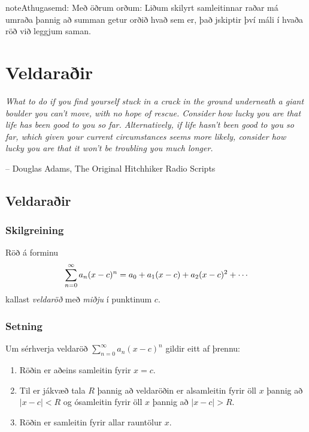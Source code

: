\documentclass[b5paper,10pt,icelandic]{sphinxmanual}
\begin{document}
\begin{notice}{note}{Athugasemd:}
Með öðrum orðum:
Liðum skilyrt samleitinnar raðar má umraða þannig að summan getur orðið
hvað sem er, það jskiptir því máli í hvaða röð við leggjum saman.
\end{notice}


\chapter{Veldaraðir}
\label{kafli10:veldarair}\label{kafli10::doc}
\emph{What to do if you find yourself stuck in a crack in the ground underneath
a giant boulder you can't move, with no hope of rescue. Consider how lucky
you are that life has been good to you so far. Alternatively, if life hasn't
been good to you so far, which given your current circumstances seems more
likely, consider how lucky you are that it won't be troubling you much longer.}

-- Douglas Adams, The Original Hitchhiker Radio Scripts


\section{Veldaraðir}
\label{kafli10:id1}\label{kafli10:index-1}

\subsection{Skilgreining}
\label{kafli10:skilgreining}
Röð á forminu
\begin{gather}
\begin{split}\sum_{n=0}^\infty a_n(x-c)^n=a_0+a_1(x-c)+a_2(x-c)^2+\cdots\end{split}\notag
\end{gather}
kallast \textit{veldaröð} með \textit{miðju} í punktinum \(c\).


\subsection{Setning}
\label{kafli10:setning}\label{kafli10:setning-samleitnigeisli}
Um sérhverja veldaröð \(\sum_{n=0}^\infty a_n(x-c)^n\) gildir eitt
af þrennu:
\begin{enumerate}
\item {} 
Röðin er aðeins samleitin fyrir \(x=c\).

\item {} 
Til er jákvæð tala \(R\) þannig að veldaröðin er alsamleitin
fyrir öll \(x\) þannig að \(|x-c|<R\) og ósamleitin fyrir
öll \(x\) þannig að \(|x-c|>R\).

\item {} 
Röðin er samleitin fyrir allar rauntölur \(x\).

\end{enumerate}
\end{document}
